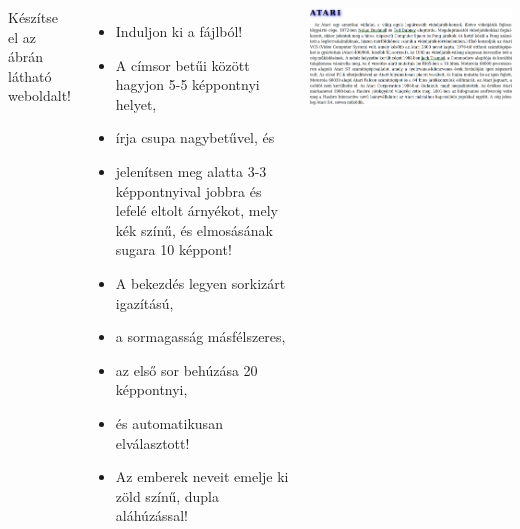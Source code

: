 \begin{frame}
  \begin{columns}[c]
      \footnotesize
      Készítse el az ábrán látható weboldalt!
      \begin{itemize}
        \item Induljon ki a  fájlból!
        \item A címsor betűi között hagyjon 5-5 képpontnyi helyet,
        \item írja csupa nagybetűvel, és
        \item jelenítsen meg alatta 3-3 képpontnyival jobbra és lefelé eltolt árnyékot, mely kék színű, és elmosásának sugara 10 képpont!
        \item A bekezdés legyen sorkizárt igazítású, 
        \item a sormagasság másfélszeres,
        \item az első sor behúzása 20 képpontnyi,
        \item és automatikusan elválasztott!
        \item Az emberek neveit emelje ki zöld színű, dupla aláhúzással!
      \end{itemize}
      \begin{exampleblock}{}
        \includegraphics[width=\textwidth]{szoveg.png}
      \end{exampleblock}
  \end{columns}
\end{frame}
